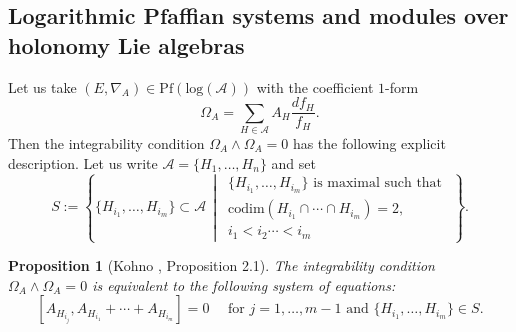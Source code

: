 \documentclass[a4paper,12pt]{article}
\newtheorem{prop}[thm]{Proposition}
\theoremstyle{definition}
\theoremstyle{remark}
\begin{document}
\subsection{Logarithmic Pfaffian systems and modules over holonomy Lie algebras}
Let us take $(E,\nabla_{A})\in \mathrm{Pf}(\mathrm{log}(\mathcal{A}))$
with the coefficient $1$-form
\[	
	\Omega_{A}=
	\sum_{H\in \mathcal{A}}A_{H}\frac{df_{H}}{f_{H}}.
\]
Then the integrability condition $\Omega_{A}\wedge \Omega_{A}=0$ has the following explicit description.
Let us write $\mathcal{A}=\{H_1,\ldots,H_n\}$ and 
set 
\[
	S:=\left\{
		\{H_{i_{1}},\ldots,H_{i_{m}}\}\subset \mathcal{A}\,\middle|\,
		\begin{array}{l}
			\{H_{i_{1}},\ldots,H_{i_{m}}\}\text{ is maximal such that }\\
			\mathrm{codim}(H_{i_{1}}\cap\cdots \cap H_{i_{m}})=2, \\
			i_{1}<i_{2}	\cdots <i_{m}
		\end{array}
	\right\}.
\]
\begin{prop}[Kohno \cite{Koh83}, Proposition 2.1]\label{prop:integrability}
	The integrability condition $\Omega_{A}\wedge \Omega_{A}=0$ is equivalent to the following system of equations:
	\[
	[A_{H_{i_{j}}},A_{H_{i_{1}}}+\cdots +A_{H_{i_{m}}}]=0\quad  \text{ for } j=1,\ldots,m-1\text{ and }\{H_{i_{1}},\ldots,H_{i_{m}}\}\in S.
	\]
\end{prop}
\end{document}
